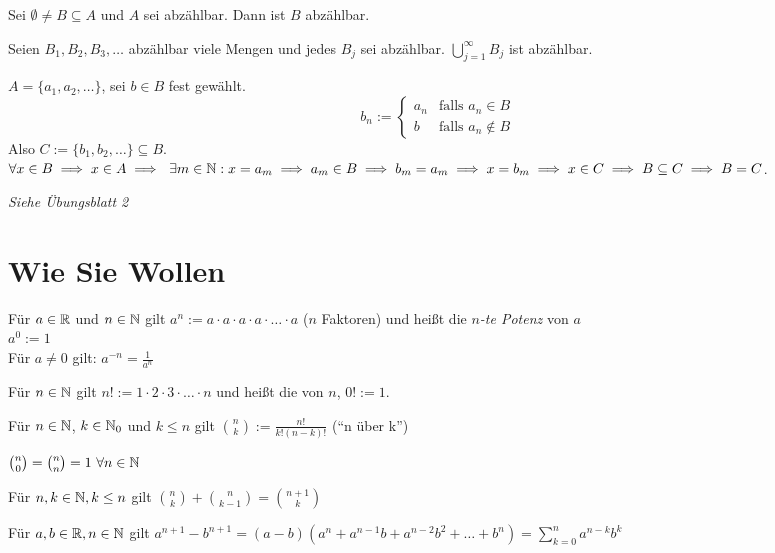 \documentclass[a4paper,twoside,DIV15,BCOR12mm]{scrbook}
\begin{document}
\begin{satz*}
\begin{liste}
\item Sei $\emptyset \ne B \subseteq A$ und $A$ sei abzählbar. Dann ist $B$ abzählbar.
\item Seien $B_1, B_2, B_3, \ldots$ abzählbar viele Mengen und jedes $B_j$ sei abzählbar. $\displaystyle \bigcup_{j=1}^\infty B_j$ ist abzählbar.
\end{liste}
\end{satz*}

\begin{beweise}
\item $A = \{a_1,a_2,\ldots\}$, sei $b \in B$ fest gewählt.
$$ b_n := \begin{cases} a_n & \mbox{falls } a_n \in B \\ b & \mbox{falls } a_n \notin B \end{cases}$$
Also $C:=\{b_1,b_2,\ldots\} \subseteq B$. $\forall x \in B \folgt x \in A \folgt \ \exists m \in \MdN: x = a_m \folgt a_m \in B \folgt b_m = a_m \folgt x=b_m \folgt x \in C \folgt B \subseteq C \folgt B = C$.
\item \textit{Siehe Übungsblatt 2}
\end{beweise}

\chapter{Wie Sie Wollen}

\begin{definition}
\begin{liste}
\item Für $a \in\mathbb{R}$ und $n\in\mathbb{N}$ gilt $a^n := a\cdot a\cdot a\cdot a\cdot \ldots \cdot a$ ($n$ Faktoren) und heißt die \textit{$n$-te Potenz} von $a$\\
    $a^0:=1$ \\
    Für $a\ne 0$ gilt: $a^{-n}=\frac{1}{a^n}$ 
\item Für $n\in\mathbb{N}$ gilt $n! := 1\cdot 2\cdot 3\cdot \ldots \cdot n $ und heißt die  von $n$, $0! := 1$.
\item Für $n\in\mathbb{N}$, $k\in\mathbb{N}_{0}$ und $k\le n$ gilt $\binom{n}{k}:=\frac{n!}{k!(n-k)!}$ ("`n über k"')
\end{liste}
\end{definition}

\begin{satz}
\begin{liste}
\item $\binom{n}{0}=\binom{n}{n}=1\ \forall n\in\mathbb{N}$
\item Für $n,k\in\mathbb{N}, k\le n$ gilt $\binom{n}{k}+\binom{n}{k-1}=\binom{n+1}{k}$
\item Für $a,b\in\mathbb{R}, n\in\mathbb{N}$ gilt $a^{n+1}-b^{n+1}=(a-b)(a^n+a^{n-1}b+a^{n-2}b^2+\ldots+b^n) = \sum_{k=0}^n a^{n-k}b^k$
\end{liste}
\end{satz}
\end{document}
